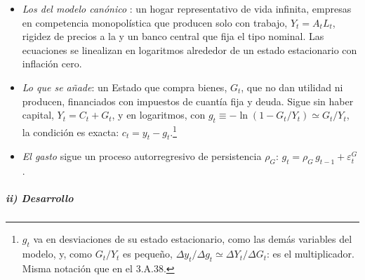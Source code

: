 \documentclass[11pt]{article}
\begin{document}
\begin{itemize}
\item \emph{Los del modelo canónico} : un hogar representativo de vida infinita, empresas en competencia monopolística que producen solo con trabajo, $Y_t=A_tL_t$, rigidez de precios a la  y un banco central que fija el tipo nominal. Las ecuaciones se linealizan en logaritmos alrededor de un estado estacionario con inflación cero.
\item \emph{Lo que se añade}: un Estado que compra bienes, $G_t$, que no dan utilidad ni producen, financiados con impuestos de cuantía fija y deuda. Sigue sin haber capital, $Y_t=C_t+G_t$, y en logaritmos, con $g_t\equiv-\ln(1-G_t/Y_t)\simeq G_t/Y_t$, la condición es exacta: $c_t=y_t-g_t$.\footnote{$g_t$ va en desviaciones de su estado estacionario, como las demás variables del modelo, y, como $G_t/Y_t$ es pequeño, $\Delta y_t/\Delta g_t\simeq\Delta Y_t/\Delta G_t$: es el multiplicador. Misma notación que en el 3.A.38.}
\item \emph{El gasto} sigue un proceso autorregresivo de persistencia $\rho_G$: $g_t=\rho_G\,g_{t-1}+\varepsilon^G_t$.
\end{itemize}

\subparagraph{ii) Desarrollo}
\end{document}
